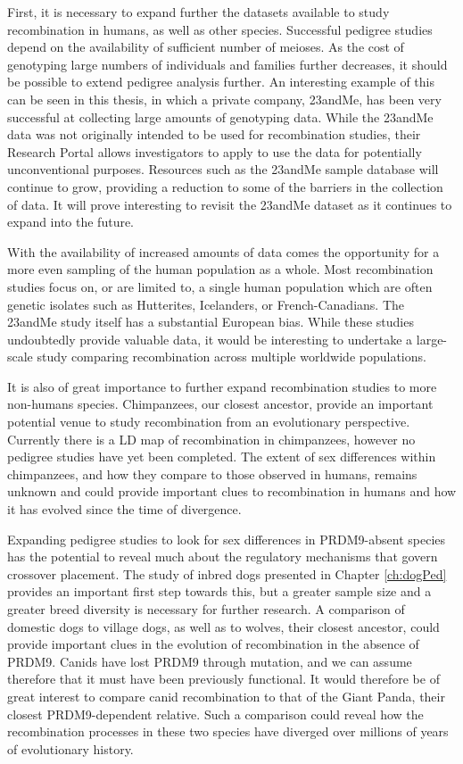 First, it is necessary to expand further the datasets available to study recombination in humans, as well as other species.
Successful pedigree studies depend on the availability of sufficient number of meioses.
As the cost of genotyping large numbers of individuals and families further decreases, it should be possible to extend pedigree analysis further.
An interesting example of this can be seen in this thesis, in which a private company, 23andMe, has been very successful at collecting large amounts of genotyping data. %
While the 23andMe data was not originally intended to be used for recombination studies, their Research Portal\cite{23andMe2013} allows investigators to apply to use the data for potentially unconventional purposes.
Resources such as the 23andMe sample database will continue to grow, providing a reduction to some of the barriers in the collection of data.
It will prove interesting to revisit the 23andMe dataset as it continues to expand into the future.

With the availability of increased amounts of data comes the opportunity for a more even sampling of the human population as a whole.
Most recombination studies focus on, or are limited to, a single human population which are often genetic isolates such as Hutterites\cite{Coop2008}, Icelanders\cite{Kong2010}, or French-Canadians\cite{Hussin2011}.
The 23andMe study itself has a substantial European bias.
While these studies undoubtedly provide valuable data, it would be interesting to undertake a large-scale study comparing recombination across multiple worldwide populations.

It is also of great importance to further expand recombination studies to more non-humans species.
Chimpanzees, our closest ancestor, provide an important potential venue to study recombination from an evolutionary perspective.
Currently there is a LD map of recombination in chimpanzees\cite{Auton2012a}, however no pedigree studies have yet been completed.
The extent of sex differences within chimpanzees, and how they compare to those observed in humans, remains unknown and could provide important clues to recombination in humans and how it has evolved since the time of divergence.

Expanding pedigree studies to look for sex differences in PRDM9-absent species has the potential to reveal much about the regulatory mechanisms that govern crossover placement.
The study of inbred dogs presented in Chapter \ref{ch:dogPed} provides an important first step towards this, but a greater sample size and a greater breed diversity is necessary for further research.
A comparison of domestic dogs to village dogs, as well as to wolves, their closest ancestor, could provide important clues in the evolution of recombination in the absence of PRDM9.
Canids have lost PRDM9 through mutation, and we can assume therefore that it must have been previously functional.
It would therefore be of great interest to compare canid recombination to that of the Giant Panda, their closest PRDM9-dependent relative.
Such a comparison could reveal how the recombination processes in these two species have diverged over millions of years of evolutionary history.

